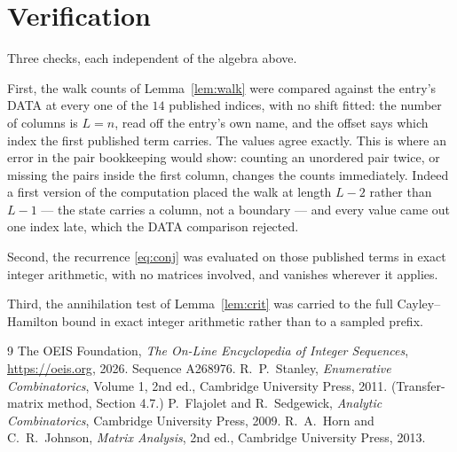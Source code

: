 \documentclass[11pt,a4paper]{article}
\theoremstyle{plain}
\theoremstyle{definition}
\begin{document}
\section{Verification}

Three checks, each independent of the algebra above.

First, the walk counts of Lemma~\ref{lem:walk} were compared against the entry's DATA at
every one of the $14$ published indices, with no shift fitted: the number of columns is
$L=n$, read off the entry's own name, and the offset says which index the first
published term carries. The values agree exactly. This is where an error in the pair
bookkeeping would show: counting an unordered pair twice, or missing the pairs inside the
first column, changes the counts immediately. Indeed a first version of the computation
placed the walk at length $L-2$ rather than $L-1$ --- the state carries a column, not a
boundary --- and every value came out one index late, which the DATA comparison rejected.

Second, the recurrence \eqref{eq:conj} was evaluated on those published terms in exact
integer arithmetic, with no matrices involved, and vanishes wherever it applies.

Third, the annihilation test of Lemma~\ref{lem:crit} was carried to the full
Cayley--Hamilton bound in exact integer arithmetic rather than to a sampled prefix.

\begin{thebibliography}{9}
 The OEIS Foundation, \emph{The On-Line Encyclopedia of Integer
Sequences}, \url{https://oeis.org}, 2026. Sequence A268976.
 R.~P.~Stanley, \emph{Enumerative Combinatorics}, Volume 1, 2nd ed.,
Cambridge University Press, 2011. (Transfer-matrix method, Section 4.7.)
 P.~Flajolet and R.~Sedgewick, \emph{Analytic Combinatorics}, Cambridge
University Press, 2009.
 R.~A.~Horn and C.~R.~Johnson, \emph{Matrix Analysis}, 2nd ed., Cambridge
University Press, 2013.
\end{thebibliography}
\end{document}
